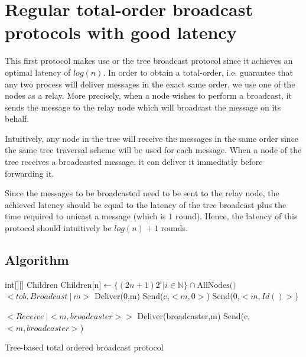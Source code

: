 \documentclass[a4paper]{article}
\begin{document}
\section{Regular total-order broadcast protocols with good latency}
\label{sec:latencyTO}

This first protocol makes use or the tree broadcast protocol since it achieves
an optimal latency of $log(n)$. In order to obtain a total-order, i.e.
guarantee that any two process will deliver messages in the exact same order,
we use one of the nodes as a relay. More precisely, when a node wishes to
perform a broadcast, it sends the message to the relay node which will
broadcast the message on its behalf.

Intuitively, any node in the tree will receive the messages in the same order
since the same tree traversal scheme will be used for each message. When a
node of the tree receives a broadcasted message, it can deliver it immediatly
before forwarding it.

Since the messages to be broadcasted need to be sent to the relay node, the
achieved latency should be equal to the latency of the tree broadcast plus
the time required to unicast a message (which is $1$ round). Hence, the
latency of this protocol should intuitively be $log(n) + 1$ rounds.

\subsection{Algorithm}
\begin{algorithm}[H]
    \centering
    \begin{algorithmic}[5]
        \Data
        \State int[][] Children
        \EndData
        \Init
        \State Children[n]$\gets\{(2n + 1)2^i | i \in \mathbb{N}\} \cap \text{AllNodes()}$
        \EndFor
        \EndInit
        \Event $< tob,Broadcast\ |\ m> $
        \State Deliver(0,m)
        \State Send(c,$<m,0>$)
        \EndFor
        \Else
        \State Send(0,$<m,Id()>$)
        \EndIf
        \EndEvent

        \Event $<Receive\ | <m,broadcaster>>$
        \State Deliver(broadcaster,m)
        \State Send(c,$<m,broadcaster>$)
        \EndFor
        \EndEvent
    \end{algorithmic}
    \caption{Tree-based total ordered broadcast protocol}
\end{algorithm}
\end{document}
